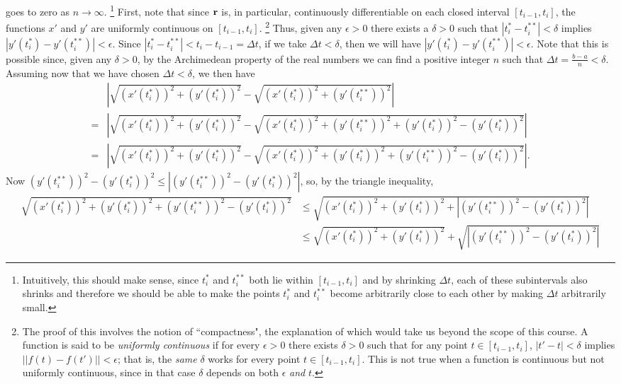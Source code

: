 \documentclass[12pt,letterpaper,reqno]{article}
\numberwithin{equation}{section}
\newcommand{\bbr}{{\bf r}}
\begin{document}
{\begin{pf}
 goes to zero as $n \to \infty$. \footnote{Intuitively, this should make sense, since $t_i^*$ and $t_i^{**}$ both lie within $[t_{i-1},t_i]$ and by shrinking $\Delta t$, each of these subintervals also shrinks and therefore we should be able to make the points $t_i^*$ and $t_i^{**}$ become arbitrarily close to each other by making $\Delta t$ arbitrarily small.} First, note that since $\bbr$ is, in particular, continuously differentiable on each closed interval $[t_{i-1},t_i]$, the functions $x'$ and $y'$ are uniformly continuous on $[t_{i-1},t_i]$. \footnote{The proof of this involves the notion of ``compactness", the explanation of which would take us beyond the scope of this course. A function is said to be \emph{uniformly continuous} if for every $\epsilon>0$ there exists $\delta>0$ such that for any point $t \in [t_{i-1},t_i]$, $|t'-t|<\delta$ implies $||f(t)-f(t')||<\epsilon$; that is, the \emph{same} $\delta$ works for every point $t \in [t_{i-1},t_i]$. This is not true when a function is continuous but not uniformly continuous, since in that case $\delta$ depends on both $\epsilon$ \emph{and} $t$.} Thus, given any $\epsilon >0$ there exists a $\delta > 0$ such that $|t_i^*-t_i^{**}|< \delta$ implies $|y'(t_i^*)-y'(t_i^{**})|<\epsilon$. Since $|t_i^*-t_i^{**}|<t_i-t_{i-1}=\Delta t$, if we take $\Delta t < \delta$, then we will have $|y'(t_i^*)-y'(t_i^{**})|<\epsilon$. Note that this is possible since, given any $\delta > 0$, by the Archimedean property of the real numbers we can find a positive integer $n$ such that $\Delta t =\frac{b-a}{n}<\delta$. Assuming now that we have chosen $\Delta t<\delta$, we then have
\begin{align*}
	&\left|\sqrt{(x'(t_i^*))^2+(y'(t_i^{*}))^2}-\sqrt{(x'(t_i^*))^2+(y'(t_i^{**}))^2}\right|\\
	=& \left|\sqrt{(x'(t_i^*))^2+(y'(t_i^{*}))^2}-\sqrt{(x'(t_i^*))^2+(y'(t_i^{**}))^2+(y'(t_i^{*}))^2-(y'(t_i^{*}))^2}\right| \\
	=& \left|\sqrt{(x'(t_i^*))^2+(y'(t_i^{*}))^2}-\sqrt{(x'(t_i^*))^2+(y'(t_i^{*}))^2+(y'(t_i^{**}))^2-(y'(t_i^{*}))^2}\right|.
\end{align*}
Now $(y'(t_i^{**}))^2-(y'(t_i^{*}))^2 \leq |(y'(t_i^{**}))^2-(y'(t_i^{*}))^2|$, so, by the triangle inequality,
\begin{align*}
	\sqrt{(x'(t_i^*))^2+(y'(t_i^{*}))^2+(y'(t_i^{**}))^2-(y'(t_i^{*}))^2} &\leq \sqrt{(x'(t_i^*))^2+(y'(t_i^{*}))^2+|(y'(t_i^{**}))^2-(y'(t_i^{*}))^2|} \\
	&\leq \sqrt{(x'(t_i^*))^2+(y'(t_i^{*}))^2}+\sqrt{|(y'(t_i^{**}))^2-(y'(t_i^{*}))^2|} 

\end{align*}
\end{pf}}
\end{document}
